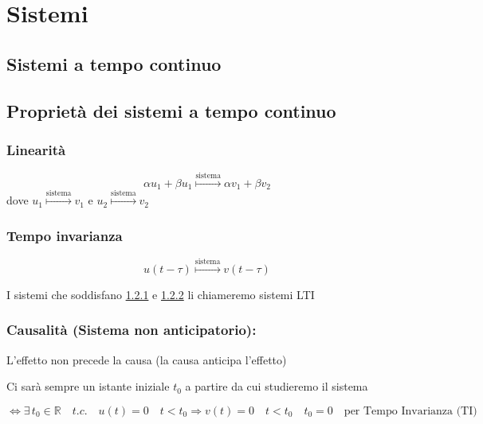 \chapter{Sistemi}
\section{Sistemi a tempo continuo}


\section{Proprietà dei sistemi a tempo continuo}
\subsection{Linearità}\label{sist_prop_Lin}  
	\[
	\alpha u_1+\beta u_1 \overset{\text{sistema}}{\longmapsto} \alpha v_1+\beta v_2
	\]
	dove $ u_1 \overset{\text{sistema}}{\longmapsto} v_1$ e $u_2\overset{\text{sistema}}{\longmapsto} v_2$
	
\subsection{Tempo invarianza} \label{sist_prop_TIn}
	\[
	u(t-\tau) \overset{\text{sistema}}{\longmapsto} v(t-\tau)
	\]
	
	\begin{definition}
		I sistemi che soddisfano \ref{sist_prop_Lin} e \ref{sist_prop_TIn} li chiameremo sistemi LTI
	\end{definition}

 \subsection{Causalità (Sistema non anticipatorio):} \label{sist_prop_cau}
	
	L'effetto non precede la causa (la causa anticipa l'effetto)
	
	\begin{oss}
		Ci sarà sempre un istante iniziale $t_0$ a partire da cui studieremo il sistema
	\end{oss}
		\[
		\Leftrightarrow \exists \,t_0 \in \mathbb{R} \quad t.c. \quad u(t)=0 \quad t<t_0
		\Rightarrow v(t)=0 \quad t<t_0
		\quad t_0 =0 \quad \text{per Tempo Invarianza (TI)}
	\]
